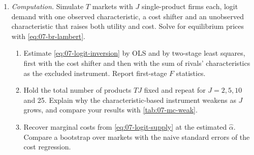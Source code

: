 \begin{enumerate}[label=\arabic*., leftmargin=*, itemsep=6pt]
\item \emph{Computation.} Simulate $T$ markets with $J$ single-product firms each, logit demand with one observed
characteristic, a cost shifter and an unobserved characteristic that raises both utility and cost. Solve for
equilibrium prices with \eqref{eq:07-br-lambert}.
\begin{enumerate}[label=(\alph*)]
  \item Estimate \eqref{eq:07-logit-inversion} by OLS and by two-stage least squares, first with the cost shifter
  and then with the sum of rivals' characteristics as the excluded instrument. Report first-stage $F$
  statistics.
  \item Hold the total number of products $TJ$ fixed and repeat for $J = 2, 5, 10$ and 25. Explain why the
  characteristic-based instrument weakens as $J$ grows, and compare your results with \cref{tab:07-mc-weak}.
  \item Recover marginal costs from \eqref{eq:07-logit-supply} at the estimated $\hat\alpha$. Compare a
  bootstrap over markets with the naive standard errors of the cost regression.
\end{enumerate}

\end{enumerate}
